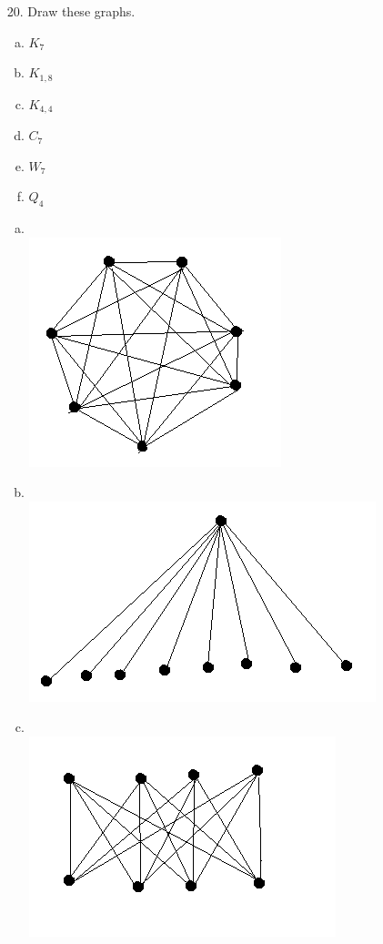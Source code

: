 \begin{itemize}
      \item[20.]  Draw these graphs.
            \begin{enumerate}[a.]
                  \item $K_7$
                  \item $K_{1,8}$
                  \item $K_{4,4}$
                  \item $C_7$
                  \item $W_7$
                  \item $Q_4$
            \end{enumerate}
            \answer
            \begin{enumerate}[a.]
                  \item \text{}\\
                        \includegraphics[scale=0.7]{img/10_2_20a_graph.png}
                  \item \text{}\\
                        \includegraphics[scale=0.7]{img/10_2_20b_graph.png}
                  \item \text{}\\
                        \includegraphics[scale=0.7]{img/10_2_20c_graph.png}

\end{enumerate}
\end{itemize}
